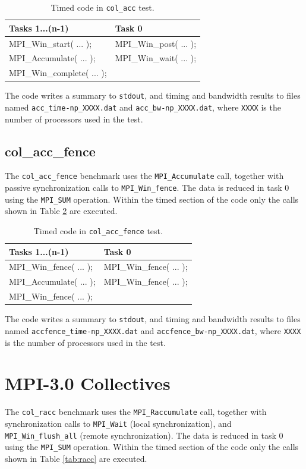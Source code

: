 \documentclass[10pt,a4paper]{report}
\begin{document}
\begin{table}[ht]
\centering
\caption{Timed code in \texttt{col\_acc} test.}
\label{tab:acc}
\begin{tabular}{|l|l|}
\hline
\bf{Tasks 1...(n-1)}	   & \bf{Task 0}\\\hline
MPI\_Win\_start( ... );    & MPI\_Win\_post( ... );\\
MPI\_Accumulate( ... );    & MPI\_Win\_wait( ... );\\
MPI\_Win\_complete( ... ); & \\\hline
\end{tabular}
\end{table}

The code writes a summary to \verb+stdout+, and timing and bandwidth results to files named \verb+acc_time-np_XXXX.dat+ and \verb+acc_bw-np_XXXX.dat+, where \verb+XXXX+ is the number of processors used in the test.

\FloatBarrier
\subsection{col\_acc\_fence}
The \verb+col_acc_fence+ benchmark uses the \verb+MPI_Accumulate+ call, together with passive synchronization calls to \verb+MPI_Win_fence+. The data is reduced in task 0 using the \verb+MPI_SUM+ operation. Within the timed section of the code only the calls shown in Table \ref{tab:acc_fence} are executed.

\begin{table}[ht]
\centering
\caption{Timed code in \texttt{col\_acc\_fence} test.}
\label{tab:acc_fence}
\begin{tabular}{|l|l|}
\hline
\bf{Tasks 1...(n-1)}	    & \bf{Task 0}\\\hline
MPI\_Win\_fence( ... ); & MPI\_Win\_fence( ... );\\
MPI\_Accumulate( ... ); & MPI\_Win\_fence( ... );\\
MPI\_Win\_fence( ... ); & \\\hline
\end{tabular}
\end{table}

The code writes a summary to \verb+stdout+, and timing and bandwidth results to files named \verb+accfence_time-np_XXXX.dat+ and \verb+accfence_bw-np_XXXX.dat+, where \verb+XXXX+ is the number of processors used in the test.

\section{MPI-3.0 Collectives}
The \verb+col_racc+ benchmark uses the \verb+MPI_Raccumulate+ call, together with synchronization calls to \verb+MPI_Wait+ (local synchronization), and \verb+MPI_Win_flush_all+ (remote synchronization). The data is reduced in task 0 using the \verb+MPI_SUM+ operation. Within the timed section of the code only the calls shown in Table \ref{tab:racc} are executed.
\end{document}
